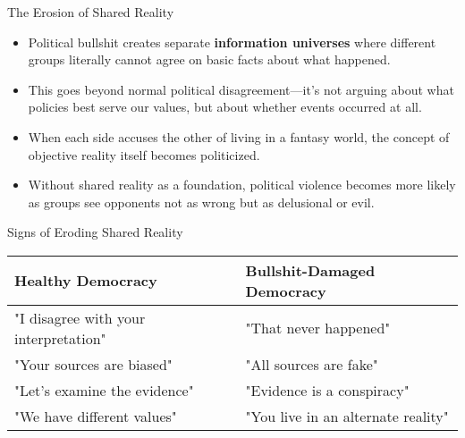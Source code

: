 \documentclass{beamer}
\begin{document}
	\begin{frame}{The Erosion of Shared Reality}
		\begin{itemize}
			\item Political bullshit creates separate \textbf{information universes} where different groups literally cannot agree on basic facts about what happened.
			\item This goes beyond normal political disagreement—it's not arguing about what policies best serve our values, but about whether events occurred at all.
			\item When each side accuses the other of living in a fantasy world, the concept of objective reality itself becomes politicized.
			\item Without shared reality as a foundation, political violence becomes more likely as groups see opponents not as wrong but as delusional or evil.
		\end{itemize}
		
		\begin{block}{Signs of Eroding Shared Reality}
			\scriptsize
			\begin{tabular}{ll}
				\textbf{Healthy Democracy} & \textbf{Bullshit-Damaged Democracy} \\
				\hline
				"I disagree with your interpretation" & "That never happened" \\
				"Your sources are biased" & "All sources are fake" \\
				"Let's examine the evidence" & "Evidence is a conspiracy" \\
				"We have different values" & "You live in an alternate reality" \\
			\end{tabular}
		\end{block}
	\end{frame}
	
\end{document}
